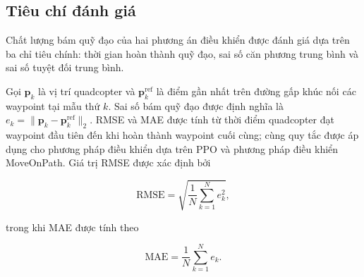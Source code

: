 \subsection{Tiêu chí đánh giá}

Chất lượng bám quỹ đạo của hai phương án điều khiển được đánh giá dựa trên ba chỉ tiêu chính: thời gian hoàn thành quỹ đạo, sai số căn phương trung bình và sai số tuyệt đối trung bình.

Gọi \(\mathbf{p}_k\) là vị trí quadcopter và \(\mathbf{p}^{\mathrm{ref}}_k\) là điểm gần nhất trên đường gấp khúc nối các waypoint tại mẫu thứ \(k\). Sai số bám quỹ đạo được định nghĩa là \(e_k=\lVert\mathbf{p}_k-\mathbf{p}^{\mathrm{ref}}_k\rVert_2\). RMSE và MAE 
được tính từ thời điểm quadcopter đạt waypoint đầu tiên đến khi hoàn thành waypoint cuối cùng; cùng quy tắc được áp dụng cho phương pháp điều khiển dựa trên PPO và phương pháp điều khiển MoveOnPath. Giá trị RMSE được xác định bởi

\begin{equation}
\mathrm{RMSE}=\sqrt{\frac{1}{N}\sum_{k=1}^{N}e_k^2},
\end{equation}

trong khi MAE được tính theo

\begin{equation}
\mathrm{MAE}=\frac{1}{N}\sum_{k=1}^{N}e_k.
\end{equation}
